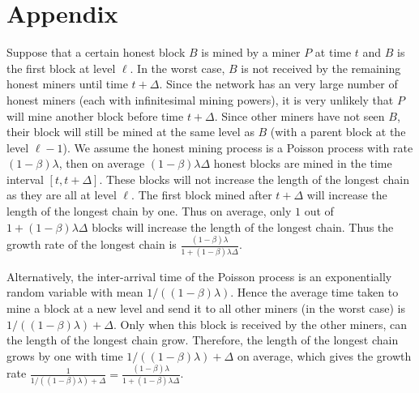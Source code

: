 \documentclass{article}
\begin{document}
\section*{Appendix}

Suppose that a certain honest block $B$ is mined by a miner $P$ at time $t$ and $B$ is the first block at level $\ell$. In the worst case, $B$ is not received by the remaining honest miners until time $t + \Delta$. Since the network has an very large number of honest miners (each with infinitesimal mining powers), it is very unlikely that $P$ will mine another block before time $t + \Delta$. Since other miners have not seen $B$, their block will still be mined at the same level as $B$ (with a parent block at the level $\ell -1$). We assume the honest mining process is a Poisson process with rate $(1-\beta)\lambda$, then on average $(1-\beta)\lambda\Delta$ honest blocks are mined in the time interval $[t, t + \Delta]$. These blocks will not increase the length of the longest chain as they are all at level $\ell$. The first block mined after $t + \Delta$ will increase the length of the longest chain by one. Thus on average, only $1$ out of $1 + (1-\beta)\lambda\Delta$ blocks will increase the length of the longest chain. Thus the growth rate of the longest chain is $\frac{(1-\beta)\lambda}{1 + (1-\beta)\lambda\Delta}$.

Alternatively, the inter-arrival time of the Poisson process is an exponentially random variable with mean $1/((1-\beta)\lambda)$. Hence the average time taken to mine a block at a new level and send it to all other miners (in the worst case) is $1/((1-\beta)\lambda) + \Delta$. Only when this block is received by the other miners, can the length of the longest chain grow. Therefore, the length of the longest chain grows by one with time $1/((1-\beta)\lambda) + \Delta$ on average, which gives the growth rate $\frac{1}{1/((1-\beta)\lambda) + \Delta} = \frac{(1-\beta)\lambda}{1 + (1-\beta)\lambda\Delta}$.


\end{document}
